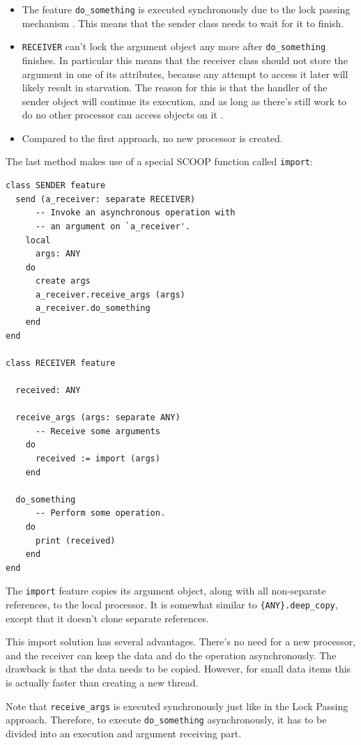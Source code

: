 \documentclass[a4paper,10pt]{article}
\begin{document}
\begin{itemize}
 \item The feature \lstinline!do_something! is executed synchronously due to the lock passing mechanism \cite[p. 152]{Nienaltowski07}\cite{web:scoop}.
 This means that the sender class needs to wait for it to finish.
 \item \lstinline!RECEIVER! can't lock the argument object any more after \lstinline!do_something! finishes.
 In particular this means that the receiver class should not store the argument in one of its attributes, because any attempt to access it later will likely result in starvation.
 The reason for this is that the handler of the sender object will continue its execution, and as long as there's still work to do no other processor can access objects on it .
 \item Compared to the first approach, no new processor is created.
\end{itemize}

The last method makes use of a special SCOOP function called \lstinline!import!:
\begin{lstlisting}[language=OOSC2Eiffel, captionpos=b, caption={Migrate objects with import.}]
class SENDER feature
  send (a_receiver: separate RECEIVER)
      -- Invoke an asynchronous operation with
      -- an argument on `a_receiver'.
    local
      args: ANY
    do
      create args
      a_receiver.receive_args (args)
      a_receiver.do_something
    end
end

class RECEIVER feature
  
  received: ANY
  
  receive_args (args: separate ANY)
      -- Receive some arguments
    do
      received := import (args)
    end

  do_something
      -- Perform some operation.
    do
      print (received)
    end
end
\end{lstlisting}
The \lstinline!import! feature copies its argument object, along with all non-separate references, to the local processor.
It is somewhat similar to \lstinline!{ANY}.deep_copy!, except that it doesn't clone separate references.

This import solution has several advantages.
There's no need for a new processor, and the receiver can keep the data and do the operation asynchronously.
The drawback is that the data needs to be copied.
However, for small data items this is actually faster than creating a new thread.

Note that \lstinline!receive_args! is executed synchronously just like in the Lock Passing approach.
Therefore, to execute \lstinline!do_something! asynchronously, it has to be divided into an execution and argument receiving part.
\end{document}

